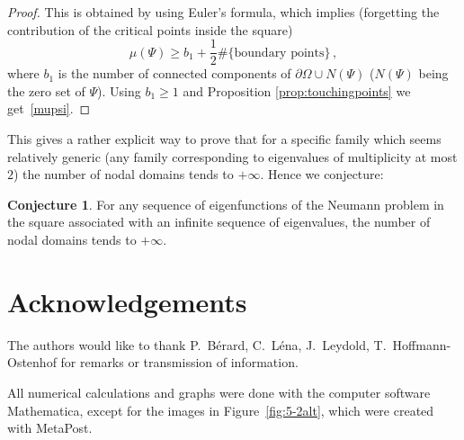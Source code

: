\documentclass[a4paper,reqno,11pt]{amsart}
\theoremstyle{remark}
\theoremstyle{definition}
\newtheorem{conjecture}[thm]{Conjecture}
\numberwithin{equation}{section}
\begin{document}
\begin{proof}
This is obtained by using Euler's formula, which implies (forgetting the 
contribution of the critical points inside the square)
\[
\mu(\Psi)\geq  b_1 + \frac 12 \#\{\mbox {boundary  points}\}   \,,
\]
where $b_1$ is the number of connected components of 
$\partial \Omega \cup N(\Psi)$ ($N(\Psi)$ being the zero set of $\Psi$).
Using $b_1\geq 1$ and Proposition \ref{prop:touchingpoints} we 
get~\eqref{mupsi}.
\end{proof}

This gives a rather explicit way to prove  that for a specific family which 
seems relatively generic (any family corresponding to eigenvalues of 
multiplicity at most $2$) the number of nodal domains tends to $+\infty$. Hence we conjecture:
\begin{conjecture}
 For any sequence of eigenfunctions of the Neumann problem in the square associated 
with an infinite sequence of eigenvalues, the number of nodal domains tends to $+\infty$.
\end{conjecture}

\section*{Acknowledgements} The authors would like to thank
P.~B\'erard, C.~L\'ena, J.~Leydold, T.~Hoffmann-Ostenhof for remarks or 
transmission of information.

All numerical calculations and graphs were done
with the computer software Mathematica, except for the images in 
Figure~\ref{fig:5-2alt}, which were created with MetaPost.
\end{document}
